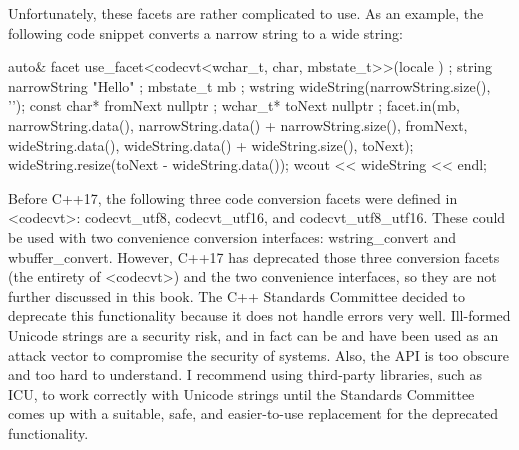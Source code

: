 Unfortunately, these facets are rather complicated to use. As an example, the following code snippet converts a narrow string to a wide string:

\begin{cpp}
auto& facet { use_facet<codecvt<wchar_t, char, mbstate_t>>(locale { }) };
string narrowString { "Hello" };
mbstate_t mb { };
wstring wideString(narrowString.size(), '\0');
const char* fromNext { nullptr };
wchar_t* toNext { nullptr };
facet.in(mb,
    narrowString.data(), narrowString.data() + narrowString.size(), fromNext,
    wideString.data(), wideString.data() + wideString.size(), toNext);
wideString.resize(toNext - wideString.data());
wcout << wideString << endl;
\end{cpp}

Before C++17, the following three code conversion facets were defined in <codecvt>: codecvt\_utf8, codecvt\_utf16, and codecvt\_utf8\_utf16. These could be used with two convenience conversion interfaces: wstring\_convert and wbuffer\_convert. However, C++17 has deprecated those three conversion facets (the entirety of <codecvt>) and the two convenience interfaces, so they are not further discussed in this book. The C++ Standards Committee decided to deprecate this functionality because it does not handle errors very well. Ill-formed Unicode strings are a security risk, and in fact can be and have been used as an attack vector to compromise the security of systems. Also, the API is too obscure and too hard to understand. I recommend using third-party libraries, such as ICU, to work correctly with Unicode strings until the Standards Committee comes up with a suitable, safe, and easier-to-use replacement for the deprecated functionality.













